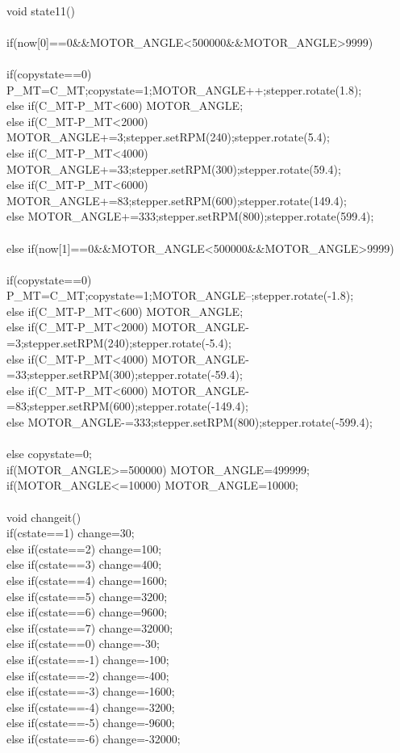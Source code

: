 \\
void state11()\\
{\\
	if(now[0]==0\&\&MOTOR\_ANGLE<500000\&\&MOTOR\_ANGLE>9999)\\
	{\\
		if(copystate==0) {P\_MT=C\_MT;copystate=1;MOTOR\_ANGLE++;stepper.rotate(1.8);}\\
		else if(C\_MT-P\_MT<600) MOTOR\_ANGLE;\\
		else if(C\_MT-P\_MT<2000) {MOTOR\_ANGLE+=3;stepper.setRPM(240);stepper.rotate(5.4);}\\
		else if(C\_MT-P\_MT<4000) {MOTOR\_ANGLE+=33;stepper.setRPM(300);stepper.rotate(59.4);}\\
		else if(C\_MT-P\_MT<6000) {MOTOR\_ANGLE+=83;stepper.setRPM(600);stepper.rotate(149.4);}\\
		else {MOTOR\_ANGLE+=333;stepper.setRPM(800);stepper.rotate(599.4);}\\
	}\\
	else if(now[1]==0\&\&MOTOR\_ANGLE<500000\&\&MOTOR\_ANGLE>9999)\\
	{\\
		if(copystate==0) {P\_MT=C\_MT;copystate=1;MOTOR\_ANGLE--;stepper.rotate(-1.8);}\\
		else if(C\_MT-P\_MT<600) MOTOR\_ANGLE;\\
		else if(C\_MT-P\_MT<2000) {MOTOR\_ANGLE-=3;stepper.setRPM(240);stepper.rotate(-5.4);}\\
		else if(C\_MT-P\_MT<4000) {MOTOR\_ANGLE-=33;stepper.setRPM(300);stepper.rotate(-59.4);}\\
		else if(C\_MT-P\_MT<6000) {MOTOR\_ANGLE-=83;stepper.setRPM(600);stepper.rotate(-149.4);}\\
		else {MOTOR\_ANGLE-=333;stepper.setRPM(800);stepper.rotate(-599.4);}\\
	}\\
	else copystate=0;\\
	if(MOTOR\_ANGLE>=500000) MOTOR\_ANGLE=499999;\\
	if(MOTOR\_ANGLE<=10000) MOTOR\_ANGLE=10000;\\
}\\
void changeit()\\
{
	if(cstate==1) change=30;\\
	else if(cstate==2) change=100;\\
	else if(cstate==3) change=400;\\
	else if(cstate==4) change=1600;\\
	else if(cstate==5) change=3200;\\
	else if(cstate==6) change=9600;\\
	else if(cstate==7) change=32000;\\
	else if(cstate==0) change=-30;\\
	else if(cstate==-1) change=-100;\\
	else if(cstate==-2) change=-400;\\
	else if(cstate==-3) change=-1600;\\
	else if(cstate==-4) change=-3200;\\
	else if(cstate==-5) change=-9600;\\
	else if(cstate==-6) change=-32000;\\
}\\
